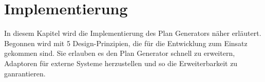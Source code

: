 \newpage
\chapter{Implementierung}

In diesem Kapitel wird die Implementierung des Plan Generators näher erläutert. Begonnen wird mit 5 Design-Prinzipien, die für die Entwicklung zum Einsatz gekommen sind. Sie erlauben es den Plan Generator schnell zu erweitern, Adaptoren für externe Systeme herzustellen und so die Erweiterbarkeit zu ganrantieren.










